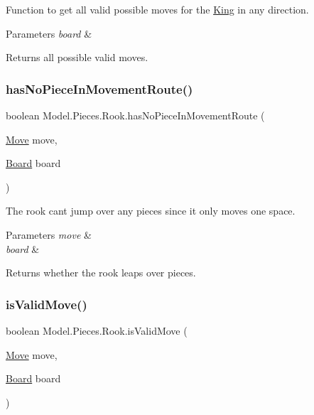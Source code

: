 Function to get all valid possible moves for the \hyperlink{class_model_1_1_pieces_1_1_king}{King} in any direction. 
\begin{DoxyParams}{Parameters}
{\em board} & \\
\hline
\end{DoxyParams}
\begin{DoxyReturn}{Returns}
all possible valid moves. 
\end{DoxyReturn}
\hypertarget{class_model_1_1_pieces_1_1_rook_abcd57b340e1eb48e1eca37461373d067}{}\label{class_model_1_1_pieces_1_1_rook_abcd57b340e1eb48e1eca37461373d067} 
\subsubsection{\texorpdfstring{has\+No\+Piece\+In\+Movement\+Route()}{hasNoPieceInMovementRoute()}}
{\footnotesize\ttfamily boolean Model.\+Pieces.\+Rook.\+has\+No\+Piece\+In\+Movement\+Route (\begin{DoxyParamCaption}\item[{\hyperlink{class_model_1_1_move}{Move}}]{move,  }\item[{\hyperlink{class_model_1_1_board}{Board}}]{board }\end{DoxyParamCaption})}

The rook can\textquotesingle{}t jump over any pieces since it only moves one space. 
\begin{DoxyParams}{Parameters}
{\em move} & \\
\hline
{\em board} & \\
\hline
\end{DoxyParams}
\begin{DoxyReturn}{Returns}
whether the rook leaps over pieces. 
\end{DoxyReturn}
\hypertarget{class_model_1_1_pieces_1_1_rook_a1558998b7bfff64ecd855c210978e1e9}{}\label{class_model_1_1_pieces_1_1_rook_a1558998b7bfff64ecd855c210978e1e9} 
\subsubsection{\texorpdfstring{is\+Valid\+Move()}{isValidMove()}}
{\footnotesize\ttfamily boolean Model.\+Pieces.\+Rook.\+is\+Valid\+Move (\begin{DoxyParamCaption}\item[{\hyperlink{class_model_1_1_move}{Move}}]{move,  }\item[{\hyperlink{class_model_1_1_board}{Board}}]{board }\end{DoxyParamCaption})}

